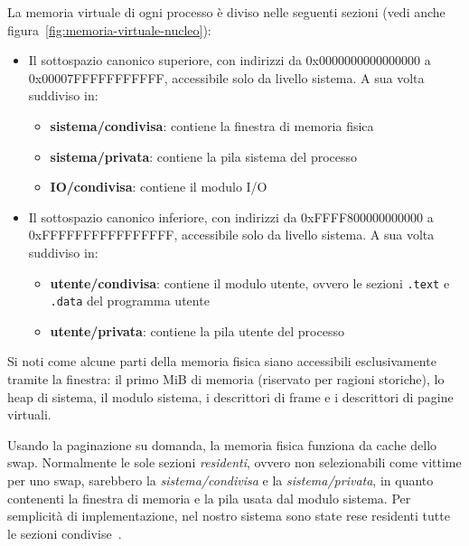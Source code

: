 La memoria virtuale di ogni processo è diviso nelle seguenti sezioni (vedi anche figura~\ref{fig:memoria-virtuale-nucleo}): 
\begin{itemize}
	\item Il sottospazio canonico superiore, con indirizzi da 0x0000000000000000 a \linebreak 0x00007FFFFFFFFFFF, accessibile solo da livello sistema. A sua volta suddiviso in:
	\begin{itemize}
		\item \textbf{sistema/condivisa}: contiene la finestra di memoria fisica
		\item \textbf{sistema/privata}: contiene la pila sistema del processo
		\item \textbf{IO/condivisa}: contiene il modulo I/O
	\end{itemize}
	\item Il sottospazio canonico inferiore, con indirizzi da 0xFFFF800000000000 a \linebreak 0xFFFFFFFFFFFFFFFF, accessibile solo da livello sistema. A sua volta suddiviso in:
	\begin{itemize}
		\item \textbf{utente/condivisa}: contiene il modulo utente, ovvero le sezioni \texttt{.text} e \texttt{.data} del programma utente
		\item \textbf{utente/privata}: contiene la pila utente del processo
	\end{itemize}
\end{itemize}
Si noti come alcune parti della memoria fisica siano accessibili esclusivamente tramite la finestra: il primo MiB di memoria (riservato per ragioni storiche), lo heap di sistema, il modulo sistema, i descrittori di frame e i descrittori di pagine virtuali.

Usando la paginazione su domanda, la memoria fisica funziona da cache dello swap. Normalmente le sole sezioni \emph{residenti}, ovvero non selezionabili come vittime per uno swap, sarebbero la \emph{sistema/condivisa} e la \emph{sistema/privata}, in quanto contenenti la finestra di memoria e la pila usata dal modulo sistema. Per semplicità di implementazione, nel nostro sistema sono state rese residenti tutte le sezioni condivise~\cite{lettieri:paginazione-nel-nucleo}.
